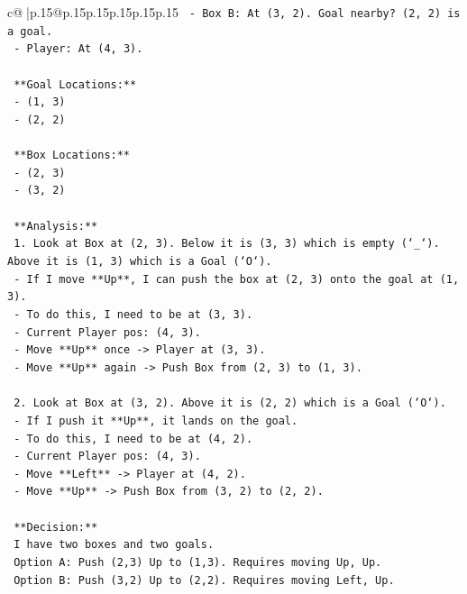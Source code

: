 \documentclass{article}
\begin{document}
{\begin{supertabular}{c@{$\;$}|p{.15\linewidth}@{}p{.15\linewidth}p{.15\linewidth}p{.15\linewidth}p{.15\linewidth}p{.15\linewidth}}
{{{\texttt{   {-} Box B: At (3, 2). Goal nearby? (2, 2) is a goal.} \\
\texttt{   {-} Player: At (4, 3).} \\
\\ 
\texttt{   **Goal Locations:**} \\
\texttt{   {-} (1, 3)} \\
\texttt{   {-} (2, 2)} \\
\\ 
\texttt{   **Box Locations:**} \\
\texttt{   {-} (2, 3)} \\
\texttt{   {-} (3, 2)} \\
\\ 
\texttt{   **Analysis:**} \\
\texttt{   1. Look at Box at (2, 3). Below it is (3, 3) which is empty (`\_`). Above it is (1, 3) which is a Goal (`O`).} \\
\texttt{      {-} If I move **Up**, I can push the box at (2, 3) onto the goal at (1, 3).} \\
\texttt{      {-} To do this, I need to be at (3, 3).} \\
\texttt{      {-} Current Player pos: (4, 3).} \\
\texttt{      {-} Move **Up** once {-}> Player at (3, 3).} \\
\texttt{      {-} Move **Up** again {-}> Push Box from (2, 3) to (1, 3).} \\
\\ 
\texttt{   2. Look at Box at (3, 2). Above it is (2, 2) which is a Goal (`O`).} \\
\texttt{      {-} If I push it **Up**, it lands on the goal.} \\
\texttt{      {-} To do this, I need to be at (4, 2).} \\
\texttt{      {-} Current Player pos: (4, 3).} \\
\texttt{      {-} Move **Left** {-}> Player at (4, 2).} \\
\texttt{      {-} Move **Up** {-}> Push Box from (3, 2) to (2, 2).} \\
\\ 
\texttt{   **Decision:**} \\
\texttt{   I have two boxes and two goals.} \\
\texttt{   Option A: Push (2,3) Up to (1,3). Requires moving Up, Up.} \\
\texttt{   Option B: Push (3,2) Up to (2,2). Requires moving Left, Up.} \\
}}}
\end{supertabular}}
\end{document}
